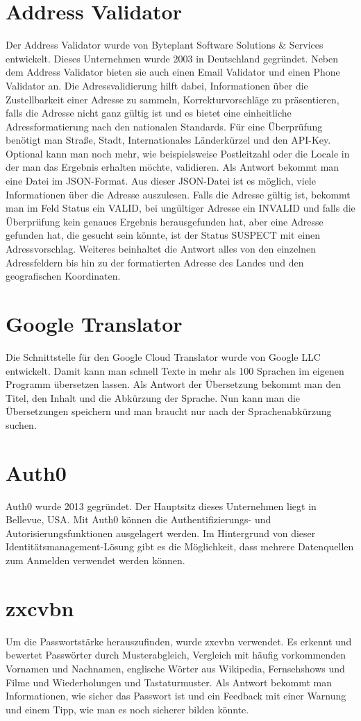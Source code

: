 \section{Address Validator}
Der Address Validator wurde von Byteplant Software Solutions \& Services entwickelt. Dieses Unternehmen wurde 2003 in Deutschland gegründet. Neben dem Address Validator bieten sie auch einen Email Validator und einen Phone Validator an. Die Adressvalidierung hilft dabei, Informationen über die Zustellbarkeit einer Adresse zu sammeln, Korrekturvorschläge zu präsentieren, falls die Adresse nicht ganz gültig ist und es bietet eine einheitliche Adressformatierung nach den nationalen Standards. Für eine Überprüfung benötigt man Straße, Stadt, Internationales Länderkürzel und den API-Key. Optional kann man noch mehr, wie beispielsweise Postleitzahl oder die Locale in der man das Ergebnis erhalten möchte, validieren. Als Antwort bekommt man eine Datei im JSON-Format. Aus dieser JSON-Datei ist es möglich, viele Informationen über die Adresse auszulesen. Falls die Adresse gültig ist, bekommt man im Feld Status ein VALID, bei ungültiger Adresse ein INVALID und falls die Überprüfung kein genaues Ergebnis herausgefunden hat, aber eine Adresse gefunden hat, die gesucht sein könnte, ist der Status SUSPECT mit einen Adressvorschlag. Weiteres beinhaltet die Antwort alles von den einzelnen Adressfeldern bis hin zu der formatierten Adresse des Landes und den geografischen Koordinaten. \cite{addressValidator}

\section{Google Translator}
Die Schnittstelle für den Google Cloud Translator wurde von Google LLC entwickelt. Damit kann man schnell Texte in mehr als 100 Sprachen im eigenen Programm übersetzen lassen. Als Antwort der Übersetzung bekommt man den Titel, den Inhalt und die Abkürzung der Sprache. Nun kann man die Übersetzungen speichern und man braucht nur nach der Sprachenabkürzung suchen.
\cite{googleTranslator}

\section{Auth0}
Auth0 wurde 2013 gegründet. Der Hauptsitz dieses Unternehmen liegt in Bellevue, USA. Mit Auth0 können die Authentifizierungs- und Autorisierungsfunktionen ausgelagert werden. Im Hintergrund von dieser Identitätsmanagement-Lösung gibt es die Möglichkeit, dass mehrere Datenquellen zum Anmelden verwendet werden können. \autocite{auth0}

\section{zxcvbn}
Um die Passwortstärke herauszufinden, wurde zxcvbn verwendet. Es erkennt und bewertet Passwörter durch Musterabgleich, Vergleich mit häufig vorkommenden Vornamen und Nachnamen, englische Wörter aus Wikipedia, Fernsehshows und Filme und Wiederholungen und Tastaturmuster. Als Antwort bekommt man Informationen, wie sicher das Passwort ist und ein Feedback mit einer Warnung und einem Tipp, wie man es noch sicherer bilden könnte. \autocite{zxcvbn}